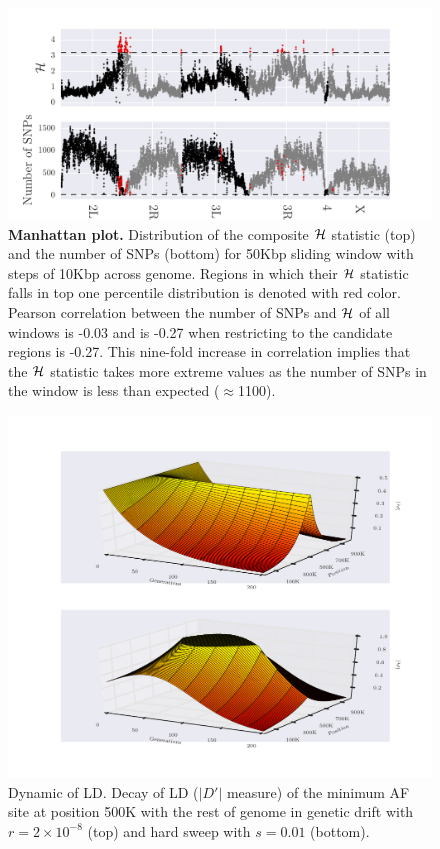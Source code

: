\documentclass[11pt]{article}
\begin{document}
\begin{figure}[H]
	\centering
	\includegraphics[width=\textwidth]{figures/manhattan.pdf}
	\caption{{\bf Manhattan plot.} Distribution of the composite ${\cal H}$ 
	statistic (top) 
		and the number of SNPs (bottom) for 50Kbp sliding window with steps of 
		10Kbp across genome. Regions in which their ${\cal H}$ statistic falls in 
		top one 
		percentile 
		distribution is denoted with red color. Pearson correlation between the 
		number of SNPs and 
		${\cal H}$ of all windows is -0.03 and is -0.27 when restricting to the 
		candidate regions is -0.27. This 
		nine-fold increase in correlation implies that the ${\cal H}$ statistic 
		takes 
		more extreme values as the number of SNPs in the window is less than 
		expected ($\approx$1100). } 
	\label{fig:manhattan}
\end{figure}

\begin{figure}[H]
	\centering
	\includegraphics[width=\textwidth]{figures/LDDecay3d}
	\caption{ {Dynamic of LD.}
		Decay of LD ($|D'|$ measure) of the minimum AF site at 
		position 500K with the rest of genome in genetic drift with 
		$r=2\times10^{-8}$ (top) and hard sweep with $s=0.01$ (bottom).}	
		\label{fig:ld3d}
\end{figure}
\end{document}
